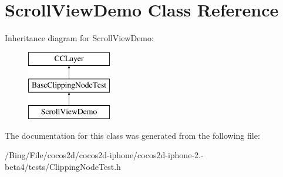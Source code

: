 \hypertarget{interface_scroll_view_demo}{\section{Scroll\-View\-Demo Class Reference}
\label{interface_scroll_view_demo}
}
Inheritance diagram for Scroll\-View\-Demo\-:\begin{figure}[H]
\begin{center}
\leavevmode
\includegraphics[height=3.000000cm]{interface_scroll_view_demo}
\end{center}
\end{figure}


The documentation for this class was generated from the following file\-:\begin{DoxyCompactItemize}
\item 
/\-Bing/\-File/cocos2d/cocos2d-\/iphone/cocos2d-\/iphone-\/2.-\/beta4/tests/Clipping\-Node\-Test.\-h\end{DoxyCompactItemize}
